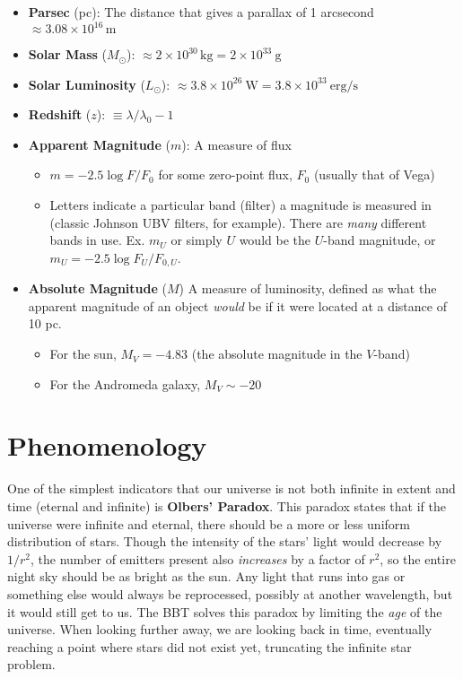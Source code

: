 \documentclass[10pt]{article}
\numberwithin{equation}{section}
\begin{document}
		\begin{itemize}
			\item \textbf{Parsec} (pc): The distance that gives a parallax of 1 arcsecond $\approx 3.08\times 10^{16}\,\mathrm{m}$
			\item \textbf{Solar Mass} ($M_\odot$): $\approx 2\times10^{30}\,\mathrm{kg} = 2\times 10^{33}\ \mathrm{g}$
			\item \textbf{Solar Luminosity} ($L_\odot$): $\approx 3.8\times 10^{26}\ \mathrm{W} = 3.8\times 10^{33}\ \mathrm{erg/s}$
			\item \textbf{Redshift} ($z$): $\equiv \lambda/\lambda_0-1$
			\item \textbf{Apparent Magnitude} ($m$): A measure of flux
			\begin{itemize}
				\item $m=-2.5\log F/F_0$ for some zero-point flux, $F_0$ (usually that of Vega)
				\item Letters indicate a particular band (filter) a magnitude is measured in (classic Johnson UBV filters, for example). There are \emph{many} different bands in use. Ex. $m_U$ or simply $U$ would be the $U$-band magnitude, or $m_U=-2.5 \log F_U/F_{0,U}$.
			\end{itemize}
			\item \textbf{Absolute Magnitude} ($M$) A measure of luminosity, defined as what the apparent magnitude of an object \emph{would} be if it were located at a distance of 10 pc.
			\begin{itemize}
				\item For the sun, $M_V = -4.83$ (the absolute magnitude in the $V$-band)
				\item For the Andromeda galaxy, $M_V\sim -20$
			\end{itemize}
		\end{itemize}


\section{Phenomenology} %
\label{sec:phenomenology}
	One of the simplest indicators that our universe is not both infinite in extent and time (eternal and infinite) is \textbf{Olbers' Paradox}. This paradox states that if the universe were infinite and eternal, there should be a more or less uniform distribution of stars. Though the intensity of the stars' light would decrease by $1/r^2$, the number of emitters present also \emph{increases} by a factor of $r^2$, so the entire night sky should be as bright as the sun. Any light that runs into gas or something else would always be reprocessed, possibly at another wavelength, but it would still get to us. The BBT solves this paradox by limiting the \emph{age} of the universe. When looking further away, we are looking back in time, eventually reaching a point where stars did not exist yet, truncating the infinite star problem.\\
	
\end{document}
